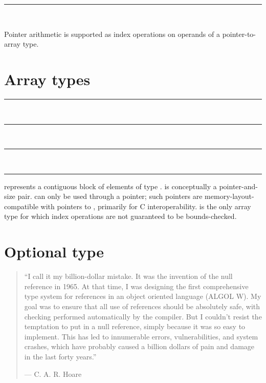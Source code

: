 \begin{grammar}
\rule{pointer-type}  \code{*}\\
\end{grammar}

Pointer arithmetic is supported as index operations on operands of a
pointer-to-array type.

\section{Array types}

\begin{grammar}
\rule{array-type-with-constant-size}  \code{[}  \code{]}\\
\rule{array-type-with-runtime-size}  \code{[} \code{]}\\
\rule{array-type-with-unknown-size}  \code{[}  \code{]}\\
\rule{element-type} 
\end{grammar}

 represents a contiguous block of
 elements of type .
 is conceptually a pointer-and-size
pair.  can only be used through a
pointer; such pointers are memory-layout-compatible with pointers to
, primarily for C interoperability.
 is the only array type for which
index operations are not guaranteed to be bounds-checked.

\section{Optional type}

\begin{quote}
``I call it my billion-dollar mistake. It was the invention of the null
reference in 1965. At that time, I was designing the first comprehensive type
system for references in an object oriented language (ALGOL W). My goal was to
ensure that all use of references should be absolutely safe, with checking
performed automatically by the compiler. But I couldn't resist the temptation to
put in a null reference, simply because it was so easy to implement. This has
led to innumerable errors, vulnerabilities, and system crashes, which have
probably caused a billion dollars of pain and damage in the last forty years.''

--- C. A. R. Hoare
\end{quote}

